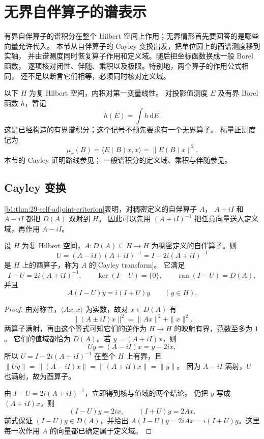 \section{无界自伴算子的谱表示}
\label{b1:sec:2906}

有界自伴算子的谱积分在整个 Hilbert 空间上作用；无界情形首先要回答的是哪些向量允许代入。
本节从自伴算子的 Cayley 变换出发，把单位圆上的酉谱测度移到实轴，
并由谱测度同时恢复算子作用和定义域。随后把坐标函数换成一般 Borel 函数，
逐项核对闭性、伴随、乘积以及极限。特别地，两个算子的作用公式相同，
还不足以断言它们相等，必须同时核对定义域。

以下 \(H\) 为复 Hilbert 空间，内积对第一变量线性。
对投影值测度 \(E\) 及有界 Borel 函数 \(h\)，暂记
\[
 h(E)=\int h\,\mathrm dE.
\]
这是已经构造的有界谱积分；这个记号不预先要求有一个无界算子。
标量正测度记为
\[
 \mu_x(B)=\langle E(B)x,x\rangle=\|E(B)x\|^2.
\]
本节的 Cayley 证明路线参见\cite[Theorem 13.30, pp.~368--369]{Rudin1991Functional}；
一般谱积分的定义域、乘积与伴随参见\cite[Theorem 13.24, pp.~362--364]{Rudin1991Functional}。

\subsection{Cayley 变换}
\label{b1:subsec:290601}

\cref{b1:thm:29-self-adjoint-criterion}表明，对稠密定义的自伴算子 \(A\)，
\(A+iI\) 和 \(A-iI\) 都把 \(D(A)\) 双射到 \(H\)。
因此可以先用 \((A+iI)^{-1}\) 把任意向量送入定义域，再作用 \(A-iI\)。

\begin{proposition}
\label{b1:prop:29-cayley}
设 \(H\) 为复 Hilbert 空间，\(A:D(A)\subseteq H\to H\) 为稠密定义的自伴算子。则
\[
 U=(A-iI)(A+iI)^{-1}
   =I-2i(A+iI)^{-1}
\]
是 \(H\) 上的酉算子，称为 \(A\) 的[Cayley transform]。
它满足
\begin{equation}\label{b1:eq:29-cayley-domain}
 I-U=2i(A+iI)^{-1},\qquad
 \ker(I-U)=\{0\},\qquad
 \operatorname{ran}(I-U)=D(A),
\end{equation}
并且
\begin{equation}\label{b1:eq:29-cayley-inverse}
 A(I-U)y=i(I+U)y\qquad(y\in H).
\end{equation}
\end{proposition}
\begin{proof}
由对称性，\(\langle Ax,x\rangle\) 为实数，故对 \(x\in D(A)\) 有
\[
 \|(A\pm iI)x\|^2=\|Ax\|^2+\|x\|^2.
\]
两算子满射，再由这个等式可知它们的逆作为 \(H\to H\) 的映射有界，范数至多为 \(1\)。
它们的值域都恰为 \(D(A)\)。若 \(y=(A+iI)x\)，则
\[
 Uy=(A-iI)x=y-2ix,
\]
所以 \(U=I-2i(A+iI)^{-1}\) 在整个 \(H\) 上有界，且
\(\|Uy\|=\|(A-iI)x\|=\|(A+iI)x\|=\|y\|\)。
因为 \(A-iI\) 满射，\(U\) 也满射，故为酉算子。

由 \(I-U=2i(A+iI)^{-1}\)，立即得到核与值域的两个结论。
仍把 \(y\) 写成 \((A+iI)x\)，则
\[
 (I-U)y=2ix,\qquad (I+U)y=2Ax.
\]
前式保证 \((I-U)y\in D(A)\)，并给出
\(A(I-U)y=2iAx=i(I+U)y\)。这里每一次作用 \(A\) 的向量都已确定属于定义域。
\end{proof}


